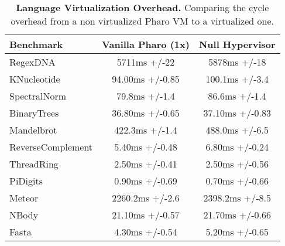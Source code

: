  \begin{table}[ht]

 	\centering
 	\begin{tabular}{|l|c|c|}%
			\hline
			\textbf{Benchmark}
 			& \textbf{Vanilla Pharo \VM (1x)}
			& \textbf{Null Hypervisor}\\
			
		\hline
		RegexDNA & 5711ms +/-22 & 5878ms +/-18 \\\hline%
		KNucleotide & 94.00ms +/-0.85 & 100.1ms +/-3.4\\\hline%
		SpectralNorm & 79.8ms +/-1.4 & 86.6ms +/-1.4\\\hline%
		BinaryTrees & 36.80ms +/-0.65 & 37.10ms +/-0.83 \\\hline%
		Mandelbrot & 422.3ms +/-1.4 & 488.0ms +/-6.5 \\\hline%
		ReverseComplement & 5.40ms +/-0.48 & 6.80ms +/-0.24 \\\hline%
		ThreadRing & 2.50ms +/-0.41 & 2.50ms +/-0.56\\\hline%
		PiDigits & 0.90ms +/-0.69 & 0.70ms +/-0.66 \\\hline%
		Meteor & 2260.2ms +/-2.6 & 2398.2ms +/-8.5 \\\hline%
		NBody & 21.10ms +/-0.57 & 21.70ms +/-0.66 \\\hline%
		Fasta & 4.30ms +/-0.54 & 5.20ms +/-0.65 \\\hline%
 	\end{tabular}
	\vspace*{0.2cm}
 	\caption{\small\textbf{Language Virtualization Overhead.} Comparing the cycle overhead from a non virtualized Pharo VM to a virtualized one.\label{tb:benchmarks}}
 \end{table}

